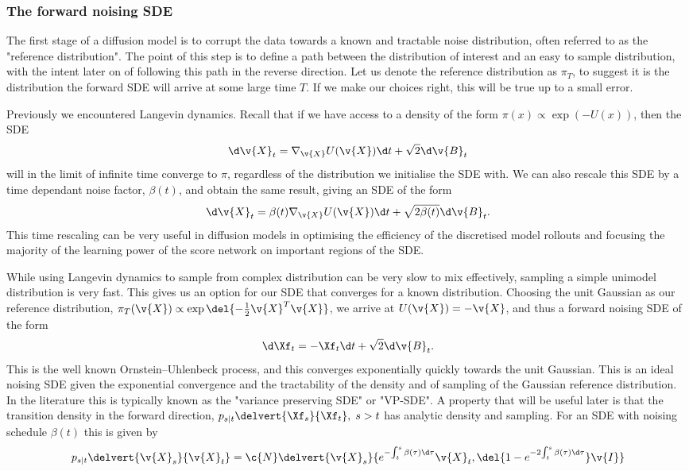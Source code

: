 \subsubsection{The forward noising SDE}

The first stage of a diffusion model is to corrupt the data towards a known and tractable noise distribution, often referred to as the "reference distribution".
The point of this step is to define a path between the distribution of interest and an easy to sample distribution, with the intent later on of following this path in the reverse direction.
Let us denote the reference distribution as \(\pi_T\), to suggest it is the distribution the forward SDE will arrive at some large time \(T\).
If we make our choices right, this will be true up to a small error.

Previously we encountered Langevin dynamics.
Recall that if we have access to a density of the form \(\pi(x) \propto \exp(-U(x))\), then the SDE \[\d \v{X}_t = \nabla_{\v{X}} U(\v{X}) \d t + \sqrt{2} \d \v{B}_t\] will in the limit of infinite time converge to \(\pi\), regardless of the distribution we initialise the SDE with.
 We can also rescale this SDE by a time dependant noise factor, \(\beta({t})\), and obtain the same result, giving an SDE of the form \[\d \v{X}_t = \beta(t) \nabla_{\v{X}} U(\v{X}) \d t + \sqrt{2 \beta(t)} \d \v{B}_t.\]
This time rescaling can be very useful in diffusion models in optimising the efficiency of the discretised model rollouts and focusing the majority of the learning power of the score network on important regions of the SDE.

While using Langevin dynamics to sample from complex distribution can be very slow to mix effectively, sampling a simple unimodel distribution is very fast.
This gives us an option for our SDE that converges for a known distribution.
Choosing the unit Gaussian as our reference distribution, \(\pi_T(\v{X}) \propto \exp\del{-\tfrac{1}{2} \v{X}^T \v{X}}\), we arrive at \(U(\v{X}) = -\v{X}\), and thus a forward noising SDE of the form \[\d \Xf_t = -\Xf_t\d t + \sqrt{2} \d \v{B}_t .\]
This is the well known Ornstein–Uhlenbeck process, and this converges exponentially quickly towards the unit Gaussian.
This is an ideal noising SDE given the exponential convergence and the tractability of the density and of sampling of the Gaussian reference distribution.
In the literature this is typically known as the "variance preserving SDE" or "VP-SDE".
A property that will be useful later is that the transition density in the forward direction, \(p_{s|t}\delvert{\Xf_s}{\Xf_t}, \; s > t\) has analytic density and sampling.
For an SDE with noising schedule \(\beta(t)\) this is given by \[ p_{s|t}\delvert{\v{X}_s}{\v{X}_t} = \c{N}\delvert{\v{X}_s}{e^{-{\int_t^s \beta(\tau)\d\tau}} \v{X}_t, \del{1-e^{-2{\int_t^s \beta(\tau)\d\tau}}}\v{I}}\]

